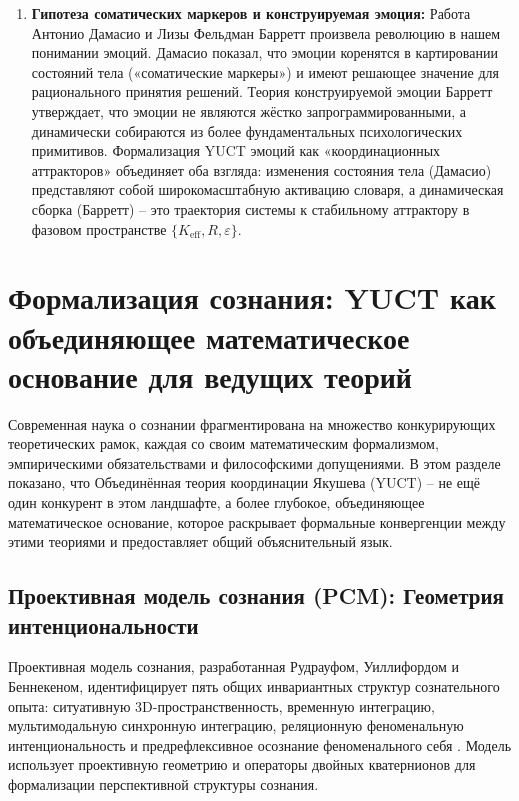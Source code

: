 \documentclass[12pt,a4paper]{article}
\begin{document}
\begin{enumerate}
		\item \textbf{Гипотеза соматических маркеров и конструируемая эмоция:} Работа Антонио Дамасио и Лизы Фельдман Барретт произвела революцию в нашем понимании эмоций. Дамасио показал, что эмоции коренятся в картировании состояний тела («соматические маркеры») и имеют решающее значение для рационального принятия решений. Теория конструируемой эмоции Барретт утверждает, что эмоции не являются жёстко запрограммированными, а динамически собираются из более фундаментальных психологических примитивов. Формализация YUCT эмоций как «координационных аттракторов» объединяет оба взгляда: изменения состояния тела (Дамасио) представляют собой широкомасштабную активацию словаря, а динамическая сборка (Барретт) – это траектория системы к стабильному аттрактору в фазовом пространстве \(\{K_{\mathrm{eff}}, R, \varepsilon\}\).
	\end{enumerate}
	
	\section{Формализация сознания: YUCT как объединяющее математическое основание для ведущих теорий}
	
	Современная наука о сознании фрагментирована на множество конкурирующих теоретических рамок, каждая со своим математическим формализмом, эмпирическими обязательствами и философскими допущениями. В этом разделе показано, что Объединённая теория координации Якушева (YUCT) – не ещё один конкурент в этом ландшафте, а более глубокое, объединяющее математическое основание, которое раскрывает формальные конвергенции между этими теориями и предоставляет общий объяснительный язык.
	
	\subsection{Проективная модель сознания (PCM): Геометрия интенциональности}
	
	Проективная модель сознания, разработанная Рудрауфом, Уиллифордом и Беннекеном, идентифицирует пять общих инвариантных структур сознательного опыта: ситуативную 3D-пространственность, временную интеграцию, мультимодальную синхронную интеграцию, реляционную феноменальную интенциональность и предрефлексивное осознание феноменального себя \cite{Rudrauf2023}. Модель использует проективную геометрию и операторы двойных кватернионов для формализации перспективной структуры сознания.
	
\end{document}
